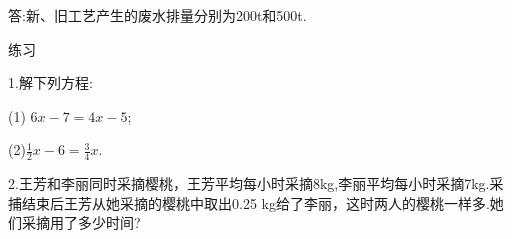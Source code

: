 \documentclass{article}
\begin{document}
\begin{article}
\begin{example}
    答:新、旧工艺产生的废水排量分别为200t和500t.
    \end{example}
    \begin{exercise}
   
   练习
   
    1.解下列方程:
    
    (1) $6x-7=4x-5$;
    
    (2)$\frac{1}{2}x-6=\frac{3}{4}x$.
    
    2.王芳和李丽同时采摘樱桃，王芳平均每小时采摘8kg,李丽平均每小时采摘7kg.采捕结束后王芳从她采摘的樱桃中取出0.25 kg给了李丽，这时两人的樱桃一样多.她们采摘用了多少时间?
    \end{exercise}
\end{article}
\end{document}
